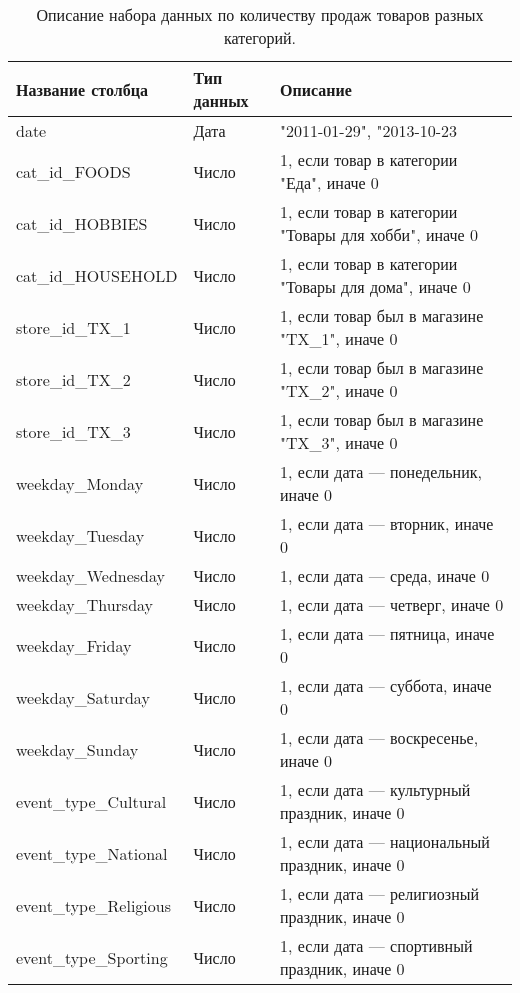 \begin{table}
    \centering
    \begin{tabular}{|l|l||l|}
		\hline
			Название столбца	& Тип данных				& Описание \\
		\hline
			date				& Дата 			& "2011-01-29", "2013-10-23			\\
			cat\_id\_FOODS		& Число			& 1, если товар в категории "Еда", иначе 0 \\
			cat\_id\_HOBBIES		& Число		& 1, если товар в категории "Товары для хобби", иначе 0 \\
			cat\_id\_HOUSEHOLD	& Число			& 1, если товар в категории "Товары для дома", иначе 0 \\
			store\_id\_TX\_1		& Число		& 1, если товар был в магазине "TX\_1", иначе 0  \\
			store\_id\_TX\_2		& Число		& 1, если товар был в магазине "TX\_2", иначе 0  \\
			store\_id\_TX\_3		& Число		& 1, если товар был в магазине "TX\_3", иначе 0  \\
			weekday\_Monday			& Число  	& 1, если дата --- понедельник, иначе 0		\\
			weekday\_Tuesday		& Число  	& 1, если дата --- вторник, иначе 0		\\
			weekday\_Wednesday		& Число  	& 1, если дата --- среда, иначе 0		\\
			weekday\_Thursday		& Число  	& 1, если дата --- четверг, иначе 0		\\
			weekday\_Friday			& Число  	& 1, если дата --- пятница, иначе 0		\\
			weekday\_Saturday		& Число  	& 1, если дата --- суббота, иначе 0		\\
			weekday\_Sunday			& Число  	& 1, если дата --- воскресенье, иначе 0	\\
			event\_type\_Cultural	& Число 	& 1, если дата --- культурный  праздник, иначе 0 \\
			event\_type\_National	& Число 	& 1, если дата --- национальный  праздник, иначе 0 \\
			event\_type\_Religious	& Число 	& 1, если дата --- религиозный  праздник, иначе 0 \\
			event\_type\_Sporting	& Число 	& 1, если дата --- спортивный праздник, иначе 0 \\
		\hline
	\end{tabular}
	\caption{ Описание набора данных по количеству продаж товаров разных категорий. }
	\label{tbl:sales_dataset_description}
\end{table}

